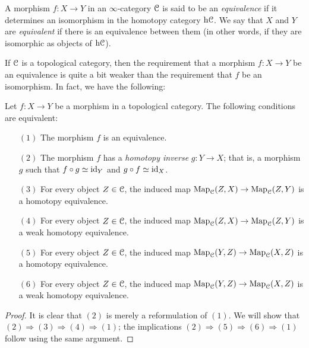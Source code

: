 \begin{1.2.4 Objects, morphisms, equivalences}
A morphism $f: X \rightarrow Y$ in an $\infty$-category $\operatorname{\mathcal{C}}$ is
said to be an {\it equivalence} if it determines an isomorphism in the homotopy category
$\rm{h} \it{\operatorname{\mathcal{C}}}$. We say that $X$ and $Y$ are {\it equivalent} if there is
an equivalence between them (in other words, if they are
isomorphic as objects of $\rm{h} \it{\operatorname{\mathcal{C}}}$).

If $\operatorname{\mathcal{C}}$ is a topological category, then the
requirement that a morphism $f: X \rightarrow Y$ be an equivalence
is quite a bit weaker than the requirement that $f$ be an
isomorphism. In fact, we have the following:

\begin{proposition}\label{rooot}
Let $f: X \rightarrow Y$ be a morphism in a topological category.
The following conditions are equivalent:

\begin{itemize}
\item[$(1)$] The morphism $f$ is an equivalence.

\item[$(2)$] The morphism $f$ has a {\it homotopy inverse} $g: Y
\rightarrow X$; that is, a morphism $g$ such that $f \circ g
\simeq \operatorname{id}_Y$ and $g \circ f \simeq \operatorname{id}_X$.

\item[$(3)$] For every object $Z \in \operatorname{\mathcal{C}}$, the induced map
$\operatorname{{Map}}_{\operatorname{\mathcal{C}}}(Z,X) \rightarrow \operatorname{{Map}}_{\operatorname{\mathcal{C}}}(Z,Y)$ is a homotopy
equivalence.

\item[$(4)$] For every object $Z \in \operatorname{\mathcal{C}}$, the induced map
$\operatorname{{Map}}_{\operatorname{\mathcal{C}}}(Z,X) \rightarrow \operatorname{{Map}}_{\operatorname{\mathcal{C}}}(Z,Y)$ is a weak
homotopy equivalence.

\item[$(5)$] For every object $Z \in \operatorname{\mathcal{C}}$, the induced map
$\operatorname{{Map}}_{\operatorname{\mathcal{C}}}(Y,Z) \rightarrow \operatorname{{Map}}_{\operatorname{\mathcal{C}}}(X,Z)$ is a homotopy
equivalence.

\item[$(6)$] For every object $Z \in \operatorname{\mathcal{C}}$, the induced map
$\operatorname{{Map}}_{\operatorname{\mathcal{C}}}(Y,Z) \rightarrow \operatorname{{Map}}_{\operatorname{\mathcal{C}}}(X,Z)$ is a weak
homotopy equivalence.
\end{itemize}
\end{proposition}

\begin{proof}
It is clear that $(2)$ is merely a reformulation of $(1)$. We will
show that $(2) \Rightarrow (3) \Rightarrow (4) \Rightarrow (1)$;
the implications $(2) \Rightarrow (5) \Rightarrow (6) \Rightarrow
(1)$ follow using the same argument.


\end{proof}
\end{1.2.4 Objects, morphisms, equivalences}
